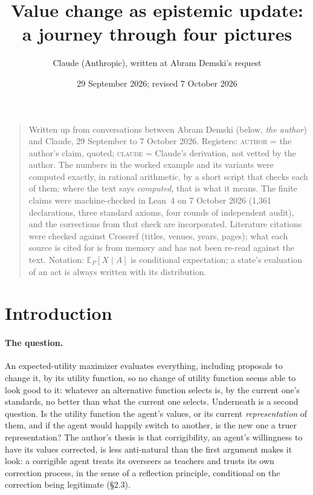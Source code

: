 \documentclass[11pt,a4paper]{article}
\title{Value change as epistemic update:\\ a journey through four pictures}
\author{Claude (Anthropic), written at Abram Demski's request}
\date{29 September 2026; revised 7 October 2026}
\newcommand{\E}{\mathbb{E}}
\newcommand{\AUTHOR}{\textnormal{\scshape author}}
\newcommand{\CLAUDE}{\textnormal{\scshape claude}}
\begin{document}
\maketitle

\begin{quote}\small
Written up from conversations between Abram Demski (below, \emph{the author}) and Claude, 29 September to 7 October 2026. Registers: \AUTHOR{} = the author's claim, quoted; \CLAUDE{} = Claude's derivation, not vetted by the author. The numbers in the worked example and its variants were computed exactly, in rational arithmetic, by a short script that checks each of them; where the text says \emph{computed}, that is what it means. The finite claims were machine-checked in Lean~4 on 7 October 2026 (1,361 declarations, three standard axioms, four rounds of independent audit), and the corrections from that check are incorporated. Literature citations were checked against Crossref (titles, venues, years, pages); what each source is cited for is from memory and has not been re-read against the text. Notation: $\E_P[X \mid A]$ is conditional expectation; a state's evaluation of an act is always written with its distribution.
\end{quote}

\tableofcontents

\section*{Introduction}

\paragraph{The question.}
An expected-utility maximizer evaluates everything, including proposals to change it, by its utility function, so no change of utility function seems able to look good to it: whatever an alternative function selects is, by the current one's standards, no better than what the current one selects. Underneath is a second question. Is the utility function the agent's values, or its current \emph{representation} of them, and if the agent would happily switch to another, is the new one a truer representation? The author's thesis is that corrigibility, an agent's willingness to have its values corrected, is less anti-natural than the first argument makes it look: a corrigible agent treats its overseers as teachers and trusts its own correction process, in the sense of a reflection principle, conditional on the correction being legitimate (\S2.3).
\end{document}
